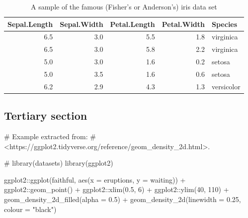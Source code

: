 \documentclass[
12pt,
openright,
oneside,
a4paper,
chapter=TITLE,
section=TITLE,
french,
spanish,
brazil,
english
]{abntex2}
\newenvironment{Shaded}{\begin{snugshade}}{\end{snugshade}}
\newcommand{\AttributeTok}[1]{\textcolor[rgb]{0.40,0.45,0.13}{#1}}
\newcommand{\CommentTok}[1]{\textcolor[rgb]{0.37,0.37,0.37}{#1}}
\newcommand{\DecValTok}[1]{\textcolor[rgb]{0.68,0.00,0.00}{#1}}
\newcommand{\FloatTok}[1]{\textcolor[rgb]{0.68,0.00,0.00}{#1}}
\newcommand{\FunctionTok}[1]{\textcolor[rgb]{0.28,0.35,0.67}{#1}}
\newcommand{\NormalTok}[1]{\textcolor[rgb]{0.00,0.23,0.31}{#1}}
\newcommand{\SpecialCharTok}[1]{\textcolor[rgb]{0.37,0.37,0.37}{#1}}
\newcommand{\StringTok}[1]{\textcolor[rgb]{0.13,0.47,0.30}{#1}}
\begin{document}
\begin{table}
\caption{A sample of the famous (Fisher's or Anderson's) iris data set}\tabularnewline

\centering
\begin{tabular}{r|r|r|r|l}
\hline
Sepal.Length & Sepal.Width & Petal.Length & Petal.Width & Species\\
\hline
6.5 & 3.0 & 5.5 & 1.8 & virginica\\
\hline
6.5 & 3.0 & 5.8 & 2.2 & virginica\\
\hline
5.0 & 3.0 & 1.6 & 0.2 & setosa\\
\hline
5.0 & 3.5 & 1.6 & 0.6 & setosa\\
\hline
6.2 & 2.9 & 4.3 & 1.3 & versicolor\\
\hline
\end{tabular}
\end{table}

\hypertarget{tertiary-section}{%
\subsection{Tertiary section}\label{tertiary-section}}

\begin{Shaded}
\begin{Highlighting}[numbers=left,,]
\CommentTok{\# Example extracted from:}
\CommentTok{\# \textless{}https://ggplot2.tidyverse.org/reference/geom\_density\_2d.html\textgreater{}.}

\CommentTok{\# library(datasets)}
\FunctionTok{library}\NormalTok{(ggplot2)}

\NormalTok{ggplot2}\SpecialCharTok{::}\FunctionTok{ggplot}\NormalTok{(faithful, }\FunctionTok{aes}\NormalTok{(}\AttributeTok{x =}\NormalTok{ eruptions, }\AttributeTok{y =}\NormalTok{ waiting)) }\SpecialCharTok{+}
\NormalTok{  ggplot2}\SpecialCharTok{::}\FunctionTok{geom\_point}\NormalTok{() }\SpecialCharTok{+}
\NormalTok{  ggplot2}\SpecialCharTok{::}\FunctionTok{xlim}\NormalTok{(}\FloatTok{0.5}\NormalTok{, }\DecValTok{6}\NormalTok{) }\SpecialCharTok{+}
\NormalTok{  ggplot2}\SpecialCharTok{::}\FunctionTok{ylim}\NormalTok{(}\DecValTok{40}\NormalTok{, }\DecValTok{110}\NormalTok{) }\SpecialCharTok{+}
  \FunctionTok{geom\_density\_2d\_filled}\NormalTok{(}\AttributeTok{alpha =} \FloatTok{0.5}\NormalTok{) }\SpecialCharTok{+}
  \FunctionTok{geom\_density\_2d}\NormalTok{(}\AttributeTok{linewidth =} \FloatTok{0.25}\NormalTok{, }\AttributeTok{colour =} \StringTok{"black"}\NormalTok{)}
\end{Highlighting}
\end{Shaded}
\end{document}
